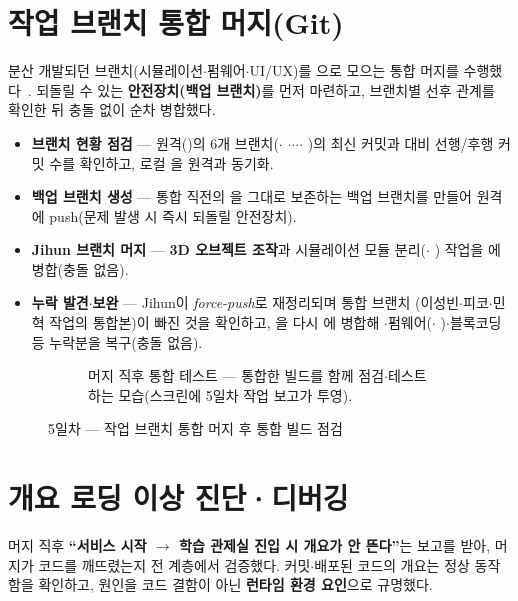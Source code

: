 \section{작업 브랜치 통합 머지(Git)}
분산 개발되던 브랜치(시뮬레이션$\cdot$펌웨어$\cdot$UI/UX)를 으로 모으는 통합
머지를 수행했다~\cite{chacon2014progit}. 되돌릴 수 있는 \textbf{안전장치(백업 브랜치)}를 먼저 마련하고, 브랜치별
선후 관계를 확인한 뒤 충돌 없이 순차 병합했다.

\smallskip
\noindent{}   %
 

\begin{itemize}
  \item \textbf{브랜치 현황 점검} — 원격()의 6개 브랜치($\cdot$%
  $\cdot$$\cdot$$\cdot$$\cdot$%
  )의 최신 커밋과  대비 선행/후행 커밋 수를 확인하고,
  로컬 을 원격과 동기화.
  \item \textbf{백업 브랜치 생성} — 통합 직전의 을 그대로 보존하는
   백업 브랜치를 만들어 원격에 push(문제 발생 시 즉시 되돌릴 안전장치).
  \item \textbf{Jihun 브랜치 머지} — \textbf{3D 오브젝트 조작}과 시뮬레이션 모듈 분리($\cdot$%
  ) 작업을 에 병합(충돌 없음).
  \item \textbf{누락 발견$\cdot$보완} — Jihun이 \emph{force-push}로 재정리되며 통합 브랜치
  (이성빈$\cdot$피코$\cdot$민혁 작업의 통합본)이 빠진 것을 확인하고,
  을 다시 에 병합해 $\cdot$펌웨어($\cdot$%
  )$\cdot$블록코딩 등 누락분을 복구(충돌 없음).
\end{itemize}

\begin{figure}[htbp]\centering
  \begin{subfigure}{0.7\linewidth}\centering
    \caption{머지 직후 통합 테스트 — 통합한 빌드를 함께 점검$\cdot$테스트하는 모습(스크린에 5일차 작업 보고가 투영).}
  \end{subfigure}
  \caption{5일차 — 작업 브랜치 통합 머지 후 통합 빌드 점검}
\end{figure}

\section{개요 로딩 이상 진단·디버깅}
머지 직후 \textbf{``서비스 시작 $\to$ 학습 관제실 진입 시 개요가 안 뜬다''}는 보고를 받아,
머지가 코드를 깨뜨렸는지 전 계층에서 검증했다. 커밋$\cdot$배포된 코드의 개요는 정상
동작함을 확인하고, 원인을 코드 결함이 아닌 \textbf{런타임 환경 요인}으로 규명했다.


